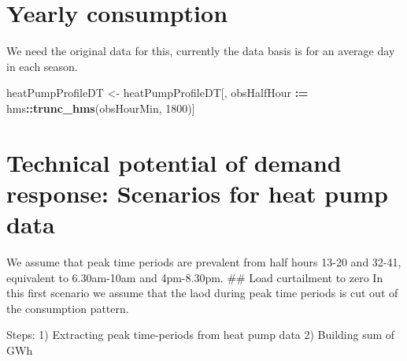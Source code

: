 \documentclass[]{article}
\newenvironment{Shaded}{\begin{snugshade}}{\end{snugshade}}
\newcommand{\KeywordTok}[1]{\textcolor[rgb]{0.13,0.29,0.53}{\textbf{#1}}}
\newcommand{\DecValTok}[1]{\textcolor[rgb]{0.00,0.00,0.81}{#1}}
\newcommand{\StringTok}[1]{\textcolor[rgb]{0.31,0.60,0.02}{#1}}
\newcommand{\OperatorTok}[1]{\textcolor[rgb]{0.81,0.36,0.00}{\textbf{#1}}}
\newcommand{\ErrorTok}[1]{\textcolor[rgb]{0.64,0.00,0.00}{\textbf{#1}}}
\newcommand{\NormalTok}[1]{#1}
\begin{document}
\section{Yearly consumption}\label{yearly-consumption}

We need the original data for this, currently the data basis is for an
average day in each season.

\begin{Shaded}
\begin{Highlighting}[]
\NormalTok{heatPumpProfileDT <-}\StringTok{ }\NormalTok{heatPumpProfileDT[, obsHalfHour }\OperatorTok{:}\ErrorTok{=}\StringTok{ }\NormalTok{hms}\OperatorTok{::}\KeywordTok{trunc_hms}\NormalTok{(obsHourMin, }\DecValTok{1800}\NormalTok{)]}
\end{Highlighting}
\end{Shaded}

\section{Technical potential of demand response: Scenarios for heat pump
data}\label{technical-potential-of-demand-response-scenarios-for-heat-pump-data}

We assume that peak time periods are prevalent from half hours 13-20 and
32-41, equivalent to 6.30am-10am and 4pm-8.30pm. \#\# Load curtailment
to zero In this first scenario we assume that the laod during peak time
periods is cut out of the consumption pattern.

Steps: 1) Extracting peak time-periods from heat pump data 2) Building
sum of GWh
\end{document}
